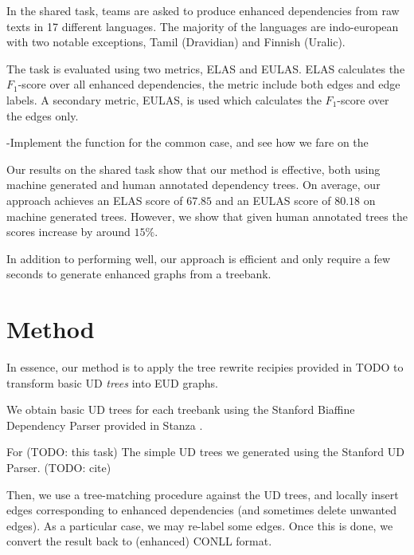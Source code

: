 \documentclass[11pt,a4paper]{article}
\begin{document}
    

In the shared task, teams are asked to produce enhanced
dependencies from raw texts in 17 different languages. The
majority of the languages are indo-european with two notable
exceptions, Tamil (Dravidian) and Finnish (Uralic).

The task is evaluated using two metrics, ELAS and EULAS. ELAS
calculates the $F_1$-score over all enhanced dependencies, the
metric include both edges and edge labels. A secondary metric,
EULAS, is used which calculates the $F_1$-score over the edges
only.

-Implement the function for the common case, and see how we fare on the

Our results on the shared task show that our method is effective,
both using machine generated and human annotated dependency
trees. On average, our approach achieves an ELAS score of $67.85$
and an EULAS score of $80.18$ on machine generated trees. However,
we show that given human annotated trees the scores increase by
around $15\%$.

In addition to performing well, our approach is efficient and only
require a few seconds to generate enhanced graphs from a
treebank.
    



\section{Method}


In essence, our method is to apply the tree rewrite recipies
provided in TODO to transform basic UD \emph{trees} into EUD
graphs.

We obtain basic UD trees for each treebank using the Stanford
Biaffine Dependency Parser \citep{dozat2016deep} provided in
Stanza \citep{qi2020stanza}.
    

For (TODO: this task) The simple UD trees we generated using the
Stanford UD Parser. (TODO: cite)

Then, we use a tree-matching procedure against the UD trees, and
locally insert edges corresponding to enhanced dependencies (and
sometimes delete unwanted edges). As a particular case, we may
re-label some edges. Once this is done, we convert the result back to
(enhanced) CONLL  format.
\end{document}
